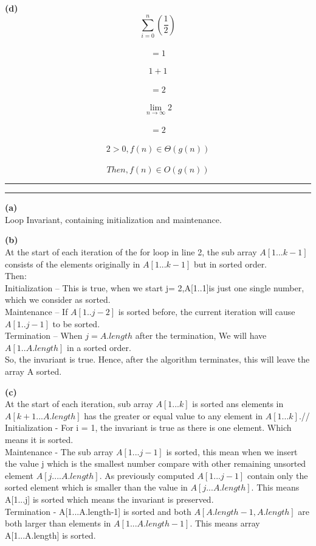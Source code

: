 \documentclass[a4paper, 11pt]{article}
\newcommand{\question}[2] {\vspace{.25in} \hrule\vspace{0.5em}
\noindent{\bf #1: #2} \vspace{0.5em}
\hrule \vspace{.10in}}
\renewcommand{\part}[1] {\vspace{.10in} {\bf (#1)}}
\begin{document}
\part{d}\\
\[\sum_{i=0}^{n} (\frac{1}{2})\]\\
\[= 1\]\\
\[1 + 1\]\\
\[=2\]\\
\[\lim_{n \to \infty} 2\]\\
\[=2\]\\
\[2 > 0, f(n) \in \Theta(g(n))\]\\
\[Then, f(n) \in O(g(n))\]

\question{2}{Problem 2}
\part{a}\\
Loop Invariant, containing initialization and maintenance.

\part{b}\\
At the start of each iteration of the for loop in line 2, the sub array $A[1...k-1]$ consists of the elements originally in $A[1...k-1]$ but in sorted order.\\
Then: \\
Initialization – This is true, when we start j= 2,A[1..1]is just one single number, which we consider as sorted.\\
Maintenance – If $A[1..j-2]$ is sorted before, the current iteration will cause $A[1..j-1]$ to be sorted.\\
Termination – When $j=A.length$ after the termination, We will have $A[1..A.length]$ in a sorted order.\\
So, the invariant is true. Hence, after the algorithm terminates, this will leave the array A sorted.

\part{c}\\
At the start of each iteration, sub array $A[1...k]$ is sorted ans elements in $A[k+1...A.length]$ has the greater or equal value to any element in $A[1...k]$.//
Initialization - For i = 1, the invariant is true as there is one element. Which means it is sorted.\\
Maintenance - The sub array $A[1...j-1]$ is sorted, this mean when we insert the value j which is the smallest number compare with other remaining unsorted element $A[j....A.length]$. As previously computed $A[1...j-1]$ contain only the sorted element which is smaller than the value in $A[j...A.length]$. This means A[1...j] is sorted which means the invariant is preserved.\\
Termination - A[1...A.length-1] is sorted and both $A[A.length-1, A.length]$ are both larger than elements in $A[1...A.length-1]$. This means array A[1...A.length] is sorted.
\end{document}
